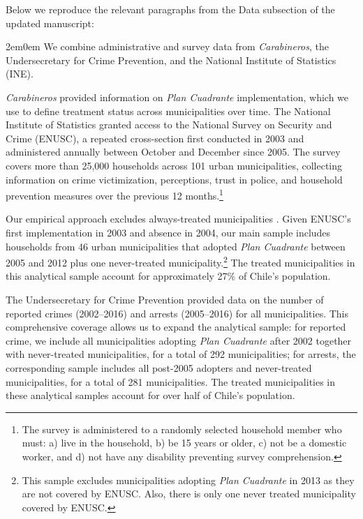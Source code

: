 Below we reproduce the relevant paragraphs from the Data subsection of the updated manuscript:

\begin{adjustwidth}{2em}{0em}
We combine administrative and survey data from \emph{Carabineros}, the Undersecretary for Crime Prevention, and the National Institute of Statistics (INE).

\emph{Carabineros} provided information on \emph{Plan Cuadrante} implementation, which we use to define treatment status across municipalities over time. The National Institute of Statistics granted access to the National Survey on Security and Crime (ENUSC), a repeated cross-section first conducted in 2003 and administered annually between October and December since 2005. The survey covers more than 25,000 households across 101 urban municipalities, collecting information on crime victimization, perceptions, trust in police, and household prevention measures over the previous 12 months.\footnote{The survey is administered to a randomly selected household member who must: a) live in the household, b) be 15 years or older, c) not be a domestic worker, and d) not have any disability preventing survey comprehension.}

Our empirical approach excludes always-treated municipalities \citep{Callaway}. Given ENUSC's first implementation in 2003 and absence in 2004, our main sample includes households from 46 urban municipalities that adopted \emph{Plan Cuadrante} between 2005 and 2012 plus one never-treated municipality.\footnote{This sample excludes municipalities adopting \emph{Plan Cuadrante} in 2013 as they are not covered by ENUSC. Also, there is only one never treated municipality covered by ENUSC.} The treated municipalities in this analytical sample account for approximately 27\% of Chile's population.

The Undersecretary for Crime Prevention provided data on the number of reported crimes (2002--2016) and arrests (2005--2016) for all municipalities. This comprehensive coverage allows us to expand the analytical sample: for reported crime, we include all municipalities adopting \emph{Plan Cuadrante} after 2002 together with never-treated municipalities, for a total of 292 municipalities; for arrests, the corresponding sample includes all post-2005 adopters and never-treated municipalities, for a total of 281 municipalities. The treated municipalities in these analytical samples account for over half of Chile's population.


\end{adjustwidth}
